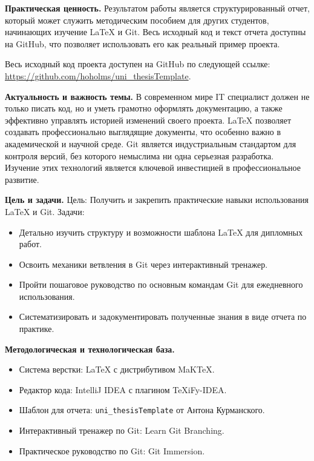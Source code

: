 \documentclass[a4paper,12pt]{report}
\newcommand{\github}{\url{https://github.com/hoholms/uni_thesisTemplate}}
\begin{document}
    \textbf{Практическая ценность.}
    Результатом работы является структурированный отчет, который может служить методическим пособием для других студентов, начинающих изучение \LaTeX{} и Git.
    Весь исходный код и текст отчета доступны на GitHub, что позволяет использовать его как реальный пример проекта.

    Весь исходный код проекта доступен на GitHub по следующей ссылке: \github.

    \clearpage
    \begin{acronym}[JPEG]
    \end{acronym}

    \introChapter

    \textbf{Актуальность и важность темы.}
    В современном мире IT специалист должен не только писать код, но и уметь грамотно оформлять документацию, а также эффективно управлять историей изменений своего проекта.
    \LaTeX{} позволяет создавать профессионально выглядящие документы, что особенно важно в академической и научной среде.
    Git является индустриальным стандартом для контроля версий, без которого немыслима ни одна серьезная разработка.
    Изучение этих технологий является ключевой инвестицией в профессиональное развитие.

    \textbf{Цель и задачи.}
    Цель: Получить и закрепить практические навыки использования \LaTeX{} и Git.
    Задачи:
    \begin{itemize}
        \item Детально изучить структуру и возможности шаблона \LaTeX{} для дипломных работ.
        \item Освоить механики ветвления в Git через интерактивный тренажер.
        \item Пройти пошаговое руководство по основным командам Git для ежедневного использования.
        \item Систематизировать и задокументировать полученные знания в виде отчета по практике.
    \end{itemize}

    \textbf{Методологическая и технологическая база.}
    \begin{itemize}
        \item Система верстки: \LaTeX{} с дистрибутивом MaKTeX\@.
        \item Редактор кода: IntelliJ IDEA с плагином TeXiFy-IDEA\@.
        \item Шаблон для отчета: \texttt{uni\_thesisTemplate} от Антона Курманского.
        \item Интерактивный тренажер по Git: Learn Git Branching\cite{gitbranching}.
        \item Практическое руководство по Git: Git Immersion\cite{gitimmersion}.
    \end{itemize}
\end{document}
